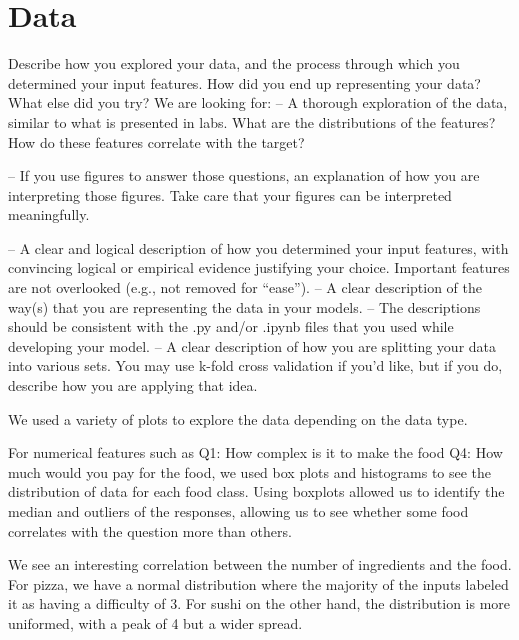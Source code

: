 \section{Data}
Describe how you explored your data, and the process through which you determined your
input features. How did you end up representing your data? What else did you try? We are looking for:
– A thorough exploration of the data, similar to what is presented in labs. What are the distributions of the features? How do these features correlate with the target?


– If you use figures to answer those questions, an explanation of how you are interpreting those figures. Take care that your figures can be interpreted meaningfully.

– A clear and logical description of how you determined your input features, with convincing logical or empirical evidence justifying your choice. Important features are not overlooked (e.g., not removed for “ease”).
– A clear description of the way(s) that you are representing the data in your models.
– The descriptions should be consistent with the .py and/or .ipynb files that you used while developing your model.
– A clear description of how you are splitting your data into various sets. You may use k-fold cross validation if you’d like, but if you do, describe how you are applying that idea.


We used a variety of plots to explore the data depending on the data type. 

For numerical features such as Q1: How complex is it to make the food Q4: How much would you pay for the food, we used box plots and histograms to see the distribution of data for each food class. Using boxplots allowed us to identify the median and outliers of the responses, allowing us to see whether some food correlates with the question more than others. 

We see an interesting correlation between the number of ingredients and the food. For pizza, we have a normal distribution where the majority of the inputs labeled it as having a difficulty of 3. For sushi on the other hand, the distribution is more uniformed, with a peak of 4 but a wider spread.

